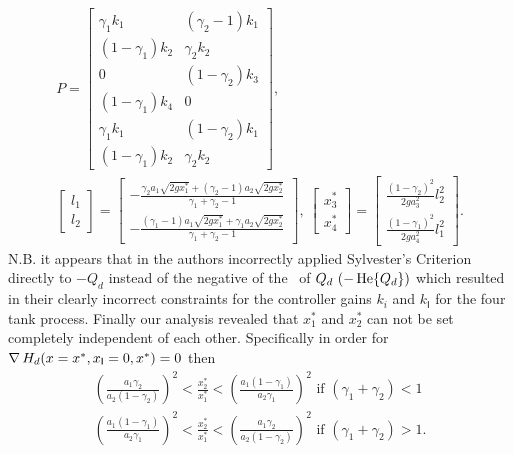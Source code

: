 \begin{gather*}
P = \begin{bmatrix}
\gamma_1 k_1 & (\gamma_2-1)k_1 \\
(1-\gamma_1)k_2 & \gamma_2 k_2 \\
0 & (1-\gamma_2)k_3\\
(1-\gamma_1)k_4 & 0\\
\gamma_1 k_1 & (1-\gamma_2)k_1 \\
(1-\gamma_1)k_2  & \gamma_2 k_2
\end{bmatrix},\\
\begin{bmatrix}
l_1\\
l_2
\end{bmatrix}= \begin{bmatrix}
-\frac{\gamma_2 a_1\sqrt{2 g x_1^*}+(\gamma_2-1) a_2
  \sqrt{2 g x_2^*}}{\gamma_1+\gamma_2-1}\\
-\frac{(\gamma_1-1) a_1\sqrt{2 g x_1^*}+\gamma_1 a_2
  \sqrt{2 g x_2^*}}{\gamma_1+\gamma_2-1}
\end{bmatrix},\ 
\begin{bmatrix}
x_3^*\\
x_4^*
\end{bmatrix}=
\begin{bmatrix}
\frac{(1-\gamma_2)^2}{2 g a_3^2}l_2^2\\
\frac{(1-\gamma_1)^2}{2ga_4^2}l_1^2
\end{bmatrix}.
\end{gather*}
N.B. it appears that in
\cite{johnsen07:_inter_and_dampin_assig_passiv} the authors
incorrectly applied Sylvester's Criterion directly to $-Q_d$ instead of
the negative of the \Hermitian\ of $Q_d\ (-\hermitian\{Q_d\})$ which
resulted in their clearly incorrect constraints for the controller
gains $k_i$ and $k_{\mathsf{I}}$ for the four tank process.  Finally
our analysis revealed that $x^*_1$ and $x^*_2$ can not be set
completely independent of each other.  Specifically in order for $\operatorname{\nabla} H_d
(x=x^*,x_{\mathsf{I}}=0,x^*)=0$ then 
\begin{gather*}
\left ( \frac{a_1 \gamma_2}{a_2(1-\gamma_2)} \right )^2 <
\frac{x_2^*}{x_1^*} < \left ( \frac{a_1 (1-\gamma_1)}{a_2\gamma_1}
\right )^2 \text{ if } (\gamma_1 + \gamma_2) < 1\\
\left ( \frac{a_1 (1-\gamma_1)}{a_2 \gamma_1} \right )^2 <
\frac{x_2^*}{x_1^*} < \left ( \frac{a_1 \gamma_2}{a_2(1-\gamma_2)}
\right )^2 \text{ if } (\gamma_1 + \gamma_2) > 1.
\end{gather*}